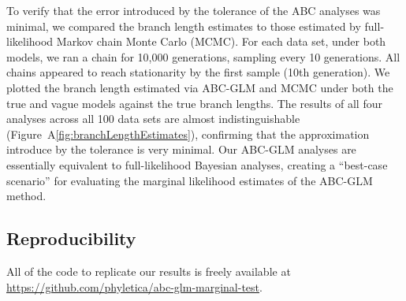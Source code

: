 To verify that the error introduced by the tolerance of the ABC analyses was
minimal, we compared the branch length estimates to those estimated by
full-likelihood Markov chain Monte Carlo (MCMC).
For each data set, under both models, we ran a chain for 10,000 generations,
sampling every 10 generations.
All chains appeared to reach stationarity by the first sample (10th
generation).
We plotted the branch length estimated via ABC-GLM and MCMC under both
the true and vague models against the true branch lengths.
The results of all four analyses across all 100 data sets are almost
indistinguishable (Figure~A\ref{fig:branchLengthEstimates}), confirming that
the approximation introduce by the tolerance is very minimal.
Our ABC-GLM analyses are essentially equivalent to full-likelihood Bayesian
analyses, creating a ``best-case scenario'' for evaluating the marginal
likelihood estimates of the ABC-GLM method.


\subsection{Reproducibility}
All of the code to replicate our results is freely available at
\href{https://github.com/phyletica/abc-glm-marginal-test}{https://github.com/phyletica/abc-glm-marginal-test}.
